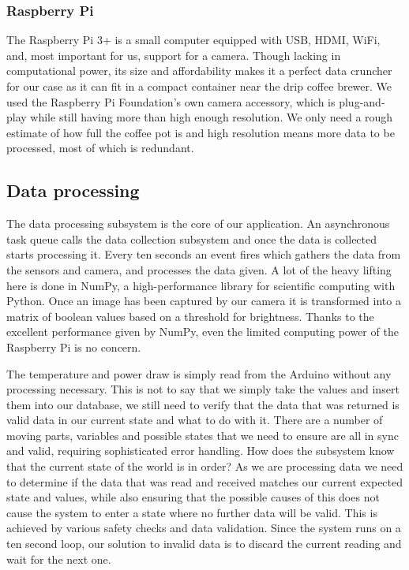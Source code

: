 \documentclass[12pt,a4paper,oneside,article]{memoir}
\numberwithin{equation}{chapter}
\begin{document}
\subsubsection{Raspberry Pi}\label{sec:raspberry-pi}
The Raspberry Pi 3+ is a small computer equipped with USB, HDMI, WiFi, and, most
important for us, support for a camera. Though lacking in computational power,
its size and affordability makes it a perfect data cruncher for our case as it
can fit in a compact container near the drip coffee brewer. We used the
Raspberry Pi Foundation's own camera accessory, which is plug-and-play while
still having more than high enough resolution. We only need a rough estimate of
how full the coffee pot is and high resolution means more data to be processed,
most of which is redundant.

\subsection{Data processing}\label{sec:data-processing}
The data processing subsystem is the core of our application. An asynchronous
task queue calls the data collection subsystem and once the data is collected
starts processing it. Every ten seconds an event fires which gathers the data
from the sensors and camera, and processes the data given. A lot of the heavy
lifting here is done in NumPy, a high-performance library for scientific
computing with Python. Once an image has been captured by our camera it is
transformed into a matrix of boolean values based on a threshold for brightness.
Thanks to the excellent performance given by NumPy, even the limited computing
power of the Raspberry Pi is no concern.

The temperature and power draw is simply read from the Arduino without any
processing necessary. This is not to say that we simply take the values and
insert them into our database, we still need to verify that the data that was
returned is valid data in our current state and what to do with it. There are a
number of moving parts, variables and possible states that we need to ensure are
all in sync and valid, requiring sophisticated error handling. How does the
subsystem know that the current state of the world is in order? As we are
processing data we need to determine if the data that was read and received
matches our current expected state and values, while also ensuring that the
possible causes of this does not cause the system to enter a state where no
further data will be valid. This is achieved by various safety checks and data
validation. Since the system runs on a ten second loop, our solution to invalid
data is to discard the current reading and wait for the next one.
\end{document}
